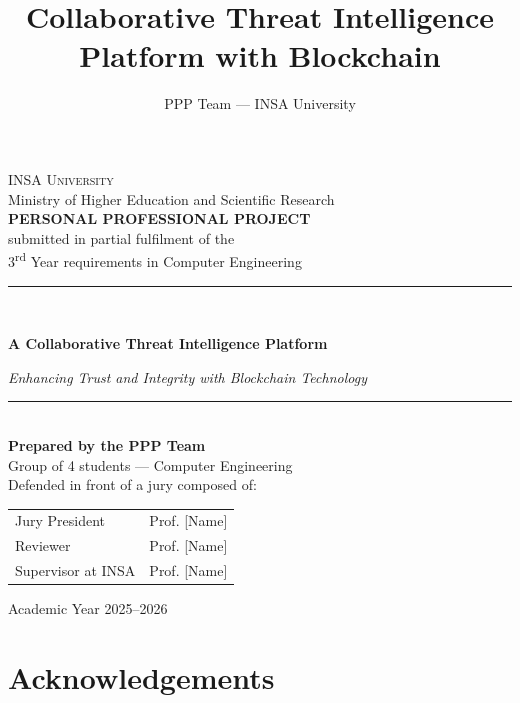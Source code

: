 \documentclass[12pt,a4paper,oneside]{book}
\author{PPP Team --- INSA University}
\title{Collaborative Threat Intelligence Platform with Blockchain}
\begin{document}

\begin{titlepage}
\centering
\vspace*{0.5cm}
{\large\textsc{INSA University}}\\[0.2cm]
{\large Ministry of Higher Education and Scientific Research}\\[1.5cm]

{\large\bfseries PERSONAL PROFESSIONAL PROJECT}\\[0.3cm]
{\normalsize submitted in partial fulfilment of the\\
3\textsuperscript{rd} Year requirements in Computer Engineering}\\[1.8cm]

\rule{\linewidth}{0.6pt}\\[0.4cm]
{\Huge\bfseries A Collaborative Threat Intelligence Platform\par}
\vspace{0.4cm}
{\LARGE\itshape Enhancing Trust and Integrity with Blockchain Technology\par}
\rule{\linewidth}{0.6pt}\\[2cm]

{\large\textbf{Prepared by the PPP Team}}\\[0.2cm]
{\normalsize Group of 4 students --- Computer Engineering}\\[1.5cm]

{\normalsize Defended in front of a jury composed of:}\\[0.4cm]
\begin{tabular}{ll}
Jury President & Prof. [Name] \\
Reviewer       & Prof. [Name] \\
Supervisor at INSA & Prof. [Name] \\
\end{tabular}

\vfill
{\large Academic Year 2025--2026}
\end{titlepage}

\chapter*{Acknowledgements}
\end{document}
